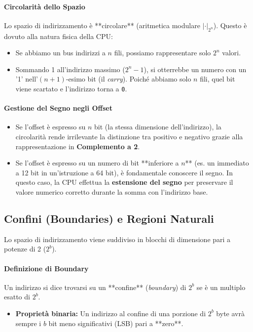 \documentclass[a4paper,12pt]{article}
\begin{document}
	\paragraph{Circolarità dello Spazio}
	Lo spazio di indirizzamento è **circolare** (aritmetica modulare $| \cdot |_{2^n}$). Questo è dovuto alla natura fisica della CPU:
	\begin{itemize}
		\item Se abbiamo un bus indirizzi a $n$ fili, possiamo rappresentare solo $2^n$ valori.
		\item Sommando 1 all'indirizzo massimo ($2^n - 1$), si otterrebbe un numero con un '1' nell'$(n+1)$-esimo bit (il \textit{carry}). Poiché abbiamo solo $n$ fili, quel bit viene scartato e l'indirizzo torna a \texttt{0}.
	\end{itemize}
	
	\paragraph{Gestione del Segno negli Offset}
	\begin{itemize}
		\item Se l'offset è espresso su $n$ bit (la stessa dimensione dell'indirizzo), la circolarità rende irrilevante la distinzione tra positivo e negativo grazie alla rappresentazione in \textbf{Complemento a 2}.
		\item Se l'offset è espresso su un numero di bit **inferiore a $n$** (es. un immediato a 12 bit in un'istruzione a 64 bit), è fondamentale conoscere il segno. In questo caso, la CPU effettua la \textbf{estensione del segno} per preservare il valore numerico corretto durante la somma con l'indirizzo base.
	\end{itemize}
	
	\subsection{Confini (Boundaries) e Regioni Naturali}
	
	Lo spazio di indirizzamento viene suddiviso in blocchi di dimensione pari a potenze di 2 ($2^b$).
	
	\paragraph{Definizione di Boundary}
	Un indirizzo si dice trovarsi su un **confine** (\textit{boundary}) di $2^b$ se è un multiplo esatto di $2^b$. 
	\begin{itemize}
		\item \textbf{Proprietà binaria:} Un indirizzo al confine di una porzione di $2^b$ byte avrà sempre i $b$ bit meno significativi (LSB) pari a **zero**.
	\end{itemize}
	
\end{document}
